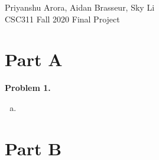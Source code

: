 \documentclass[12pt]{article}
\theoremstyle{definition} %
\theoremstyle{remark}     %
\begin{document}
\begin{flushright}
Priyanshu Arora, Aidan Brasseur, Sky Li\\ CSC311 Fall 2020 Final Project
\end{flushright}

\section*{Part A}

\textbf{Problem 1.}
\begin{enumerate}[a)]
	\item 
\end{enumerate}

\section*{Part B}
\end{document}
